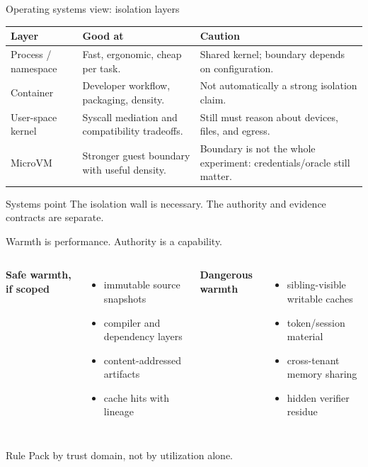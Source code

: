 \begin{frame}{Operating systems view: isolation layers}
\small
\begin{tabular}{p{}p{}p{}}
\toprule
\textbf{Layer} & \textbf{Good at} & \textbf{Caution} \\
\midrule
Process / namespace & Fast, ergonomic, cheap per task. & Shared kernel; boundary depends on configuration. \\
Container & Developer workflow, packaging, density. & Not automatically a strong isolation claim. \\
User-space kernel & Syscall mediation and compatibility tradeoffs. & Still must reason about devices, files, and egress. \\
MicroVM & Stronger guest boundary with useful density. & Boundary is not the whole experiment: credentials/oracle still matter. \\
\bottomrule
\end{tabular}
\vspace{0.6em}
\begin{block}{Systems point}
The isolation wall is necessary. The authority and evidence contracts are separate.
\end{block}
\end{frame}

\begin{frame}{Warmth is performance. Authority is a capability.}
\begin{columns}[T,onlytextwidth]
\textbf{Safe warmth, if scoped}
\begin{itemize}
  \item immutable source snapshots
  \item compiler and dependency layers
  \item content-addressed artifacts
  \item cache hits with lineage
\end{itemize}
\textbf{Dangerous warmth}
\begin{itemize}
  \item sibling-visible writable caches
  \item token/session material
  \item cross-tenant memory sharing
  \item hidden verifier residue
\end{itemize}
\end{columns}
\vspace{0.7em}
\begin{block}{Rule}
Pack by trust domain, not by utilization alone.
\end{block}
\end{frame}

